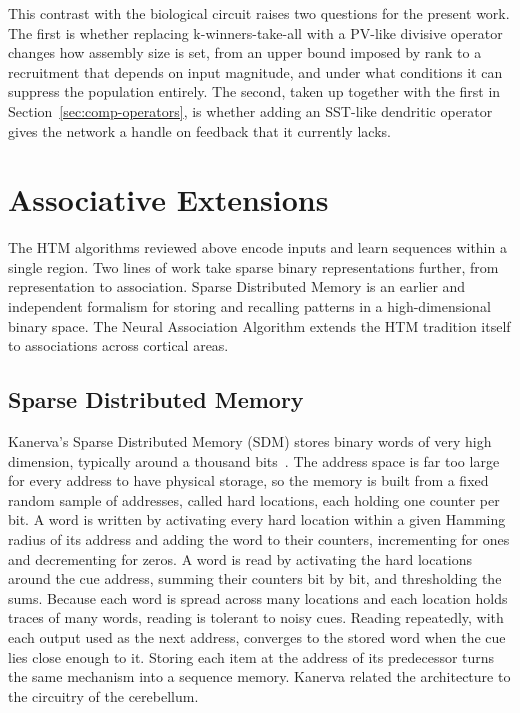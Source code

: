 This contrast with the biological circuit raises two questions for the present
work. The first is whether replacing k-winners-take-all with a PV-like
divisive operator changes how assembly size is set, from an upper bound
imposed by rank to a recruitment that depends on input magnitude, and under
what conditions it can suppress the population entirely. The second, taken up
together with the first in Section~\ref{sec:comp-operators}, is whether adding
an SST-like dendritic operator gives the network a handle on feedback that it
currently lacks.

\section{Associative Extensions}
\label{sec:comp-assoc}

The HTM algorithms reviewed above encode inputs and learn sequences within a
single region. Two lines of work take sparse binary representations further,
from representation to association. Sparse Distributed Memory is an earlier and
independent formalism for storing and recalling patterns in a high-dimensional
binary space. The Neural Association Algorithm extends the HTM tradition itself
to associations across cortical areas.

\subsection{Sparse Distributed Memory}
\label{subsec:comp-sdm}

Kanerva's Sparse Distributed Memory (SDM) stores binary words of very high
dimension, typically around a thousand bits~\cite{kanerva1988sdm}. The address
space is far too large for every address to have physical storage, so the
memory is built from a fixed random sample of addresses, called hard locations,
each holding one counter per bit. A word is written by activating every hard
location within a given Hamming radius of its address and adding the word to
their counters, incrementing for ones and decrementing for zeros. A word is read
by activating the hard locations around the cue address, summing their counters
bit by bit, and thresholding the sums. Because each word is spread across many
locations and each location holds traces of many words, reading is tolerant to
noisy cues. Reading repeatedly, with each output used as the next address,
converges to the stored word when the cue lies close enough to it. Storing each
item at the address of its predecessor turns the same mechanism into a sequence
memory. Kanerva related the architecture to the circuitry of the cerebellum.

